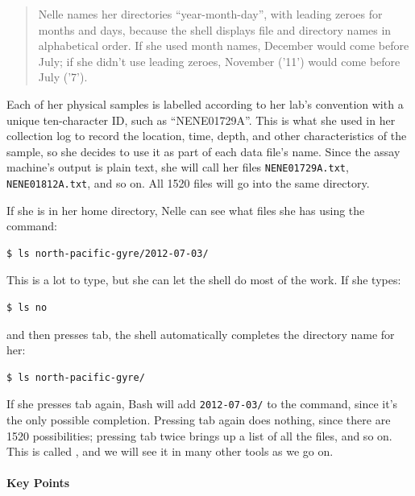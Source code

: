 \documentclass{book}
\begin{document}
\begin{quote}
Nelle names her directories ``year-month-day'', with leading zeroes for
months and days, because the shell displays file and directory names in
alphabetical order. If she used month names, December would come before
July; if she didn't use leading zeroes, November ('11') would come
before July ('7').
\end{quote}

Each of her physical samples is labelled according to her lab's
convention with a unique ten-character ID, such as ``NENE01729A''. This
is what she used in her collection log to record the location, time,
depth, and other characteristics of the sample, so she decides to use it
as part of each data file's name. Since the assay machine's output is
plain text, she will call her files \texttt{NENE01729A.txt},
\texttt{NENE01812A.txt}, and so on. All 1520 files will go into the same
directory.

If she is in her home directory, Nelle can see what files she has using
the command:

\begin{verbatim}
$ ls north-pacific-gyre/2012-07-03/
\end{verbatim}

This is a lot to type, but she can let the shell do most of the work. If
she types:

\begin{verbatim}
$ ls no
\end{verbatim}

and then presses tab, the shell automatically completes the directory
name for her:

\begin{verbatim}
$ ls north-pacific-gyre/
\end{verbatim}

If she presses tab again, Bash will add \texttt{2012-07-03/} to the
command, since it's the only possible completion. Pressing tab again
does nothing, since there are 1520 possibilities; pressing tab twice
brings up a list of all the files, and so on. This is called
, and we will see it in many
other tools as we go on.

\mbox{}\paragraph{Key Points}
\end{document}
